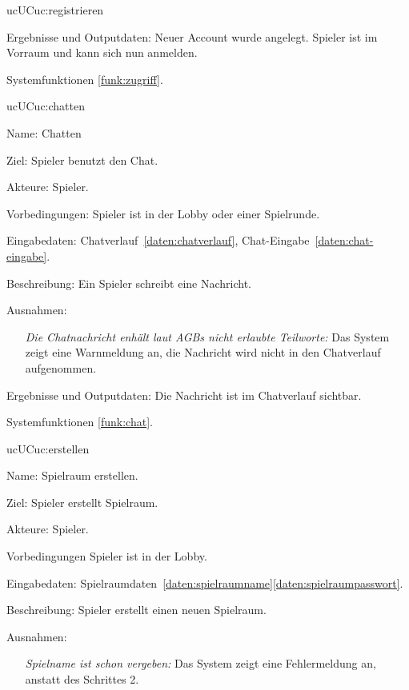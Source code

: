 \begin{description}[leftmargin=5em, style=sameline]
\begin{lhp}{uc}{UC}{uc:registrieren}
\begin{itemize}
			\end{itemize}
		\item [Ergebnisse und Outputdaten:] Neuer Account wurde angelegt. Spieler ist im Vorraum und kann sich nun anmelden.
		\item [Systemfunktionen] \ref{funk:zugriff}.
	\end{lhp}
	
	\begin{lhp}{uc}{UC}{uc:chatten}
		\item [Name:] Chatten
		\item [Ziel:] Spieler benutzt den Chat.
		\item [Akteure:] Spieler.
		\item [Vorbedingungen:] Spieler ist in der Lobby oder einer Spielrunde.
		\item [Eingabedaten:] Chatverlauf~\ref{daten:chatverlauf}, Chat-Eingabe~\ref{daten:chat-eingabe}.
		\item [Beschreibung:] Ein Spieler schreibt eine Nachricht.
		\item [Ausnahmen:] \hfill
			\begin{itemize} 
				\item[] \textit{Die Chatnachricht enhält laut AGBs nicht erlaubte Teilworte:} Das System zeigt eine Warnmeldung an, die Nachricht wird nicht in den Chatverlauf aufgenommen.
				
			\end{itemize}
		\item [Ergebnisse und Outputdaten:] Die Nachricht ist im Chatverlauf sichtbar.
		\item [Systemfunktionen] \ref{funk:chat}.
	\end{lhp}
	
	\begin{lhp}{uc}{UC}{uc:erstellen}
		\item [Name:] Spielraum erstellen.
		\item [Ziel:] Spieler erstellt Spielraum.
		\item [Akteure:] Spieler.
		\item [Vorbedingungen] Spieler ist in der Lobby.
		\item [Eingabedaten:] Spielraumdaten~\ref{daten:spielraumname}\ref{daten:spielraumpasswort}.
		\item [Beschreibung:] Spieler erstellt einen neuen Spielraum.
		\item [Ausnahmen:] \hfill
			\begin{itemize} 
				\item[] \textit{Spielname ist schon vergeben:} Das System zeigt eine Fehlermeldung an, anstatt des Schrittes 2.
				

\end{itemize}
\end{lhp}
\end{description}

